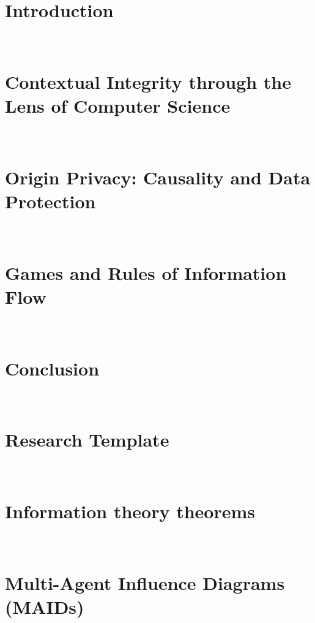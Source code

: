 \documentclass[12pt, oneside]{lib/ucthesis}
\def\ssp{\def\baselinestretch{1.0}\large\normalsize}
\begin{document}
\tableofcontents
\listoffigures 
\listoftables

\begin{acknowledgements}
\thispagestyle{plain}
 
\end{acknowledgements}




\begin{dissertationText}
\chapter{Introduction}~\label{chapter:introduction}
	
\chapter{Contextual Integrity through the Lens of Computer Science}~\label{chapter:CI-through-CS}

\chapter{Origin Privacy: Causality and Data Protection}~\label{chapter:origin-privacy}
	
\chapter[Games and Rules]{Games and Rules of Information Flow}~\label{chapter:games-and-rules}


\chapter{Conclusion}~\label{chapter:conclusion}


\ssp	%



\appendix
\chapter[Research Template]{Research Template}~\label{appendix:information-theory-theorems}


\chapter[DPI Theorems]{Information theory theorems}~\label{appendix:information-theory-theorems}


\chapter[Multi-Agent Influence Diagrams]{Multi-Agent Influence Diagrams (MAIDs)}~\label{appendix:maid}
	

\end{dissertationText}
\end{document}
